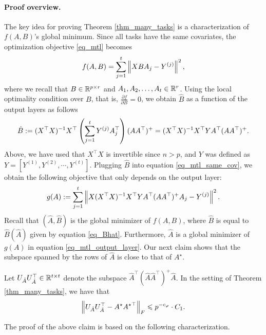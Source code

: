 \paragraph{Proof overview.} The key idea for proving Theorem \ref{thm_many_tasks} is a characterization of $f(A, B)$'s global minimum.
	Since all tasks have the same covariates, the optimization objective \eqref{eq_mtl} becomes
	\begin{align}
		f(A, B) = \sum_{j=1}^t \left\| X B A_j - Y^{(j)} \right\|^2, \label{eq_mtl_same_cov}
	\end{align}
	where we recall that $B \in \mathbb{R}^{p \times r}$ and $A_1, A_2, \dots, A_t \in \mathbb{R}^r$.
	Using the local optimality condition over $B$, that is, $\frac{\partial f}{\partial B} = 0$, we obtain $\hat{B}$ as a function of the output layers as follows
	\begin{align} \label{eq_Bhat}
		\hat{B} := (X^{\top}X)^{-1} X^{\top} \left({\sum_{j=1}^t Y^{(j)} A_j^{\top}}\right) (A  A^{\top})^{+}
		= (X^{\top} X)^{-1} X^{\top} Y A^{\top} (AA^{\top})^{+}.
	\end{align}
	Above, we have used that $X^{\top}X$ is invertible since $n > p$, and $Y$ was defined as $Y=[Y^{(1)},Y^{(2)},\cdots, Y^{(t)}]$.
	Plugging $\hat{B}$ into equation \eqref{eq_mtl_same_cov}, we obtain the following objective that only depends on the output layer:
	\begin{align}
		g(A) := \sum_{j=1}^t \left\| X (X^{\top}X)^{-1}X^{\top} Y A^{\top} (AA^{\top})^{+} A_j - Y^{(j)} \right\|^2. \label{eq_mtl_output_layer}
	\end{align}
	Recall that $(\hat{A}, \hat{B})$ is the global minimizer of $f(A, B)$, where $\hat{B}$ is equal to $\hat{B}(\hat{A})$ given by equation \eqref{eq_Bhat}.
	Furthermore, $\hat{A}$ is a global minimizer of $g(A)$ in equation \eqref{eq_mtl_output_layer}.
	Our next claim shows that the subspace spanned by the rows of $\hat{A}$ is close to that of $A^{\star}$.
	\begin{claim}\label{claim_opt_dist}
		Let $U_{\hat{A}} U_{\hat{A}}^{\top} \in\mathbb{R}^{t\times t}$ denote the subspace $\hat{A}^{\top} (\hat{A}\hat{A}^{\top})^{+} \hat{A}$.
		In the setting of Theorem \ref{thm_many_tasks}, we have that
		\[ \left\| U_{\hat{A}} U_{\hat{A}}^{\top} - A^{\star} {A^{\star}}^{\top} \right\|_{F}
				\leqslant  p^{-c_{\varphi}} \cdot C_1. \]
	\end{claim}
	The proof of the above claim is based on the following characterization.


